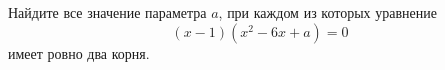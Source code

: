 \begin{ex}
	\begin{condition}
	Найдите все значение параметра $a$, при каждом из которых уравнение \[ (x-1)(x^2-6x+a)=0 \] имеет ровно два корня.
	\end{condition}
\end{ex}